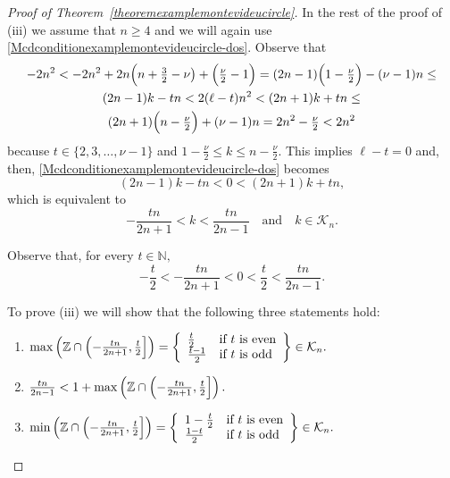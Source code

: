 \documentclass[a4paper, 11pt]{amsart}
\numberwithin{equation}{section}
\theoremstyle{customnumberedtheorem}
\theoremstyle{definitionwithbfnote}
\newcommand{\N}{\ensuremath{\mathbb{N}}}
\newcommand{\Z}{\ensuremath{\mathbb{Z}}}
\newcommand{\andq}[1][and]{\ensuremath{\quad\text{#1}\quad}}
\begin{document}
\begin{proof}[Proof of Theorem~\ref{theoremexamplemontevideucircle}]
In the rest of the proof of (iii) we assume that $n \ge 4$ and
we will again use \eqref{Mcdconditionexamplemontevideucircle-dos}.
Observe that
\begin{multline*}
 - 2n^2 < - 2n^2 + 2n\Bigl(n+\tfrac{3}{2}-\nu\bigr) + \Bigl(\tfrac{\nu}{2} - 1\Bigr) =  (2n-1)\Bigl(1-\tfrac{\nu}{2}\Bigr) - (\nu -1) n \le \\
   (2n-1) k - t n < 2(\ell - t)n^2 < (2n+1) k + t n \le \\
   (2n+1)\Bigl(n-\tfrac{\nu}{2}\Bigr) + (\nu -1) n = 2n^2-\tfrac{\nu}{2} < 2n^2
\end{multline*}
because $t \in \{2,3,\dots,\nu-1\}$ and $1-\tfrac{\nu}{2} \le k \le n-\tfrac{\nu}{2}.$
This implies $\ell-t = 0$ and, then,
\eqref{Mcdconditionexamplemontevideucircle-dos} becomes
\[
  (2n-1)k - t n  < 0 < (2n+1)k + t n,
\]
which is equivalent to
\[
  -\frac{tn}{2n+1} < k < \frac{tn}{2n-1} \andq k \in \mathcal{K}_n.
\]

Observe that, for every $t\in\N,$
\[
 -\frac{t}{2} < -\frac{tn}{2n+1} < 0 < \frac{t}{2} < \frac{tn}{2n-1}.
\]

To prove (iii) we will show that the following three statements hold:
\begin{enumerate}[{(iii.}1)]
 \item $
 \max \left( \Z \cap \Bigl(-\tfrac{tn}{2n+1},\tfrac{t}{2}\Bigr]\right) =
 \left\{\begin{array}{ll}
  \tfrac{t}{2} & \text{if $t$ is even}\\
  \tfrac{t-1}{2} & \text{if $t$ is odd}
 \end{array}\right\} \in \mathcal{K}_n.
$
\item $\tfrac{tn}{2n-1} < 1 + \max \left( \Z \cap \Bigl(-\tfrac{tn}{2n+1},\tfrac{t}{2}\Bigr]\right).$
\item $
 \min \left( \Z \cap \Bigl(-\tfrac{tn}{2n+1},\tfrac{t}{2}\Bigr]\right) =
 \left\{\begin{array}{ll}
  1-\tfrac{t}{2} & \text{if $t$ is even}\\
  \tfrac{1-t}{2} & \text{if $t$ is odd}
 \end{array}\right\} \in \mathcal{K}_n.
$
\end{enumerate}


\end{proof}
\end{document}
